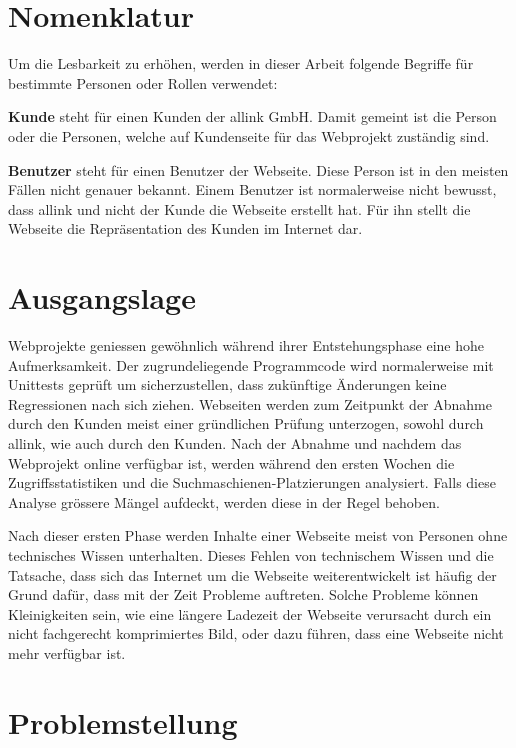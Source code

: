 
\section{Nomenklatur}
\label{sec:nomenklatur}

Um die Lesbarkeit zu erhöhen, werden in dieser Arbeit folgende Begriffe für bestimmte Personen oder Rollen verwendet:

{\bf Kunde} steht für einen Kunden der allink GmbH. Damit gemeint ist die Person oder die Personen, welche auf Kundenseite für das Webprojekt zuständig sind.

{\bf Benutzer} steht für einen Benutzer der Webseite. Diese Person ist in den meisten Fällen nicht genauer bekannt. Einem Benutzer ist normalerweise nicht bewusst, dass allink und nicht der Kunde die Webseite erstellt hat. Für ihn stellt die Webseite die Repräsentation des Kunden im Internet dar.

\section{Ausgangslage}
\label{sec:ausgangslage}

Webprojekte geniessen gewöhnlich während ihrer Entstehungsphase eine hohe Aufmerksamkeit. Der zugrundeliegende Programmcode wird normalerweise mit Unittests geprüft um sicherzustellen, dass zukünftige Änderungen keine Regressionen nach sich ziehen. Webseiten werden zum Zeitpunkt der Abnahme durch den Kunden meist einer gründlichen Prüfung unterzogen, sowohl durch allink, wie auch durch den Kunden. Nach der Abnahme und nachdem das Webprojekt online verfügbar ist, werden während den ersten Wochen die Zugriffsstatistiken und die Suchmaschienen-Platzierungen analysiert. Falls diese Analyse grössere Mängel aufdeckt, werden diese in der Regel behoben.

Nach dieser ersten Phase werden Inhalte einer Webseite meist von Personen ohne technisches Wissen unterhalten. Dieses Fehlen von technischem Wissen und die Tatsache, dass sich das Internet um die Webseite weiterentwickelt ist häufig der Grund dafür, dass mit der Zeit Probleme auftreten. Solche Probleme können Kleinigkeiten sein, wie eine längere Ladezeit der Webseite verursacht durch ein nicht fachgerecht komprimiertes Bild, oder dazu führen, dass eine Webseite nicht mehr verfügbar ist.

\section{Problemstellung}
\label{sec:problemstellung}

